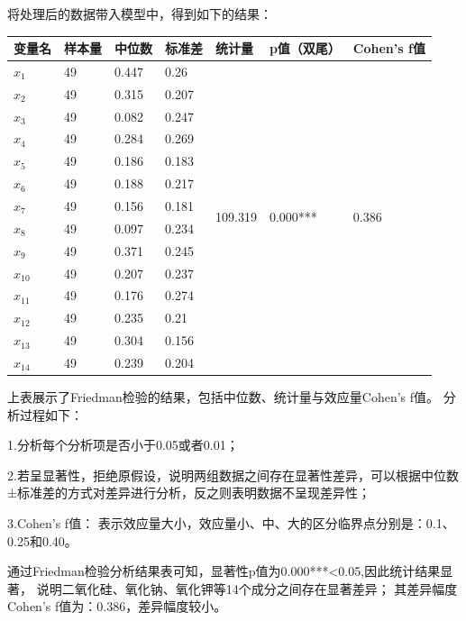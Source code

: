 \documentclass[UTF8]{ctexart}
\begin{document}
将处理后的数据带入模型中，得到如下的结果：
\begin{table}[!ht]
    \centering
    \begin{tabular}{|l|l|l|l|l|l|l|}
    \hline
        变量名 & 样本量 & 中位数 & 标准差 & 统计量 & p值（双尾） & Cohen's f值 \\ \hline
        $x_{1}$ & 49 & 0.447 & 0.26 &  \multirow{14}{*}{109.319} &  \multirow{14}{*}{0.000***} &  \multirow{14}{*}{0.386} \\ \cline{1-4}
        $x_{2}$ & 49 & 0.315 & 0.207 & ~ & ~ & ~ \\ \cline{1-4}
        $x_{3}$ & 49 & 0.082 & 0.247 & ~ & ~ & ~ \\ \cline{1-4}
        $x_{4}$ & 49 & 0.284 & 0.269 & ~ & ~ & ~ \\ \cline{1-4}
        $x_{5}$ & 49 & 0.186 & 0.183 & ~ & ~ & ~ \\ \cline{1-4}
        $x_{6}$ & 49 & 0.188 & 0.217 & ~ & ~ & ~ \\ \cline{1-4}
        $x_{7}$ & 49 & 0.156 & 0.181 & ~ & ~ & ~ \\ \cline{1-4}
        $x_{8}$ & 49 & 0.097 & 0.234 & ~ & ~ & ~ \\ \cline{1-4}
        $x_{9}$ & 49 & 0.371 & 0.245 & ~ & ~ & ~ \\ \cline{1-4}
        $x_{10}$ & 49 & 0.207 & 0.237 & ~ & ~ & ~ \\ \cline{1-4}
        $x_{11}$ & 49 & 0.176 & 0.274 & ~ & ~ & ~ \\ \cline{1-4}
        $x_{12}$ & 49 & 0.235 & 0.21 & ~ & ~ & ~ \\ \cline{1-4}
        $x_{13}$ & 49 & 0.304 & 0.156 & ~ & ~ & ~ \\ \cline{1-4}
        $x_{14}$ & 49 & 0.239 & 0.204 & ~ & ~ & ~ \\ \cline{1-4}
        \hline
    \end{tabular}
\end{table}

上表展示了Friedman检验的结果，包括中位数、统计量与效应量Cohen's f值。
分析过程如下：

1.分析每个分析项是否小于0.05或者0.01；

2.若呈显著性，拒绝原假设，说明两组数据之间存在显著性差异，可以根据中位数±标准差的方式对差异进行分析，反之则表明数据不呈现差异性；

3.Cohen's f值： 表示效应量大小，效应量小、中、大的区分临界点分别是：0.1、0.25和0.40。

通过Friedman检验分析结果表可知，显著性p值为0.000***<0.05,因此统计结果显著，
说明二氧化硅、氧化钠、氧化钾等14个成分之间存在显著差异；
其差异幅度Cohen's f值为：0.386，差异幅度较小。
\end{document}
